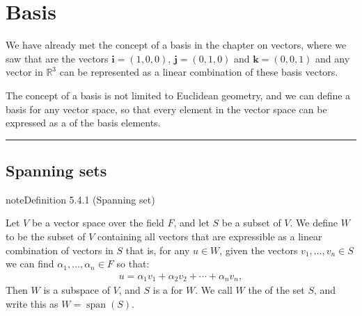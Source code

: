 \documentclass[letterpaper,10pt,english]{jupyterBook}
\begin{document}
\sphinxstepscope

\ignorespaces 

\section{Basis}
\label{\detokenize{_pages/5.4_Basis:basis}}\label{\detokenize{_pages/5.4_Basis:index-0}}\label{\detokenize{_pages/5.4_Basis:basis-section}}\label{\detokenize{_pages/5.4_Basis::doc}}
\sphinxAtStartPar
We have already met the concept of a basis in the chapter on vectors, where we saw that {\hyperref[\detokenize{_pages/3.4_Linear_combinations:basis-vectors-section}]{}} are the vectors \(\mathbf{i} = (1, 0, 0)\), \(\mathbf{j} = (0, 1, 0)\) and \(\mathbf{k} = (0, 0, 1)\) and any vector in \(\mathbb{R}^3\) can be represented as a linear combination of these basis vectors.

\sphinxAtStartPar
The concept of a basis is not limited to Euclidean geometry, and we can define a basis for any vector space, so that every element in the vector space can be expressed as a {\hyperref[\detokenize{_pages/3.4_Linear_combinations:linear-combination-of-vectors-definition}]{}} of the basis elements.


\bigskip\hrule\bigskip


\ignorespaces 

\subsection{Spanning sets}
\label{\detokenize{_pages/5.4_Basis:spanning-sets}}\label{\detokenize{_pages/5.4_Basis:index-1}}\label{_pages/5.4_Basis:spanning-set-definition}
\begin{sphinxadmonition}{note}{Definition 5.4.1 (Spanning set)}



\sphinxAtStartPar
Let \(V\) be a vector space over the field \(F\), and let \(S\) be a subset of \(V\). We define \(W\) to be the subset of \(V\) containing all vectors that are expressible as a linear combination of vectors in \(S\) \sphinxhyphen{} that is, for any \(u \in W\), given the vectors \(v_1, \ldots, v_n \in S\) we can find \(\alpha_1, \ldots, \alpha_n \in F\) so that:
\begin{equation*}
\begin{split} u = \alpha_1 v_1 + \alpha_2 v_2 + \cdots + \alpha_n v_n, \end{split}
\end{equation*}
\sphinxAtStartPar
Then \(W\) is a subspace of \(V\), and \(S\) is a  for \(W\). We call \(W\) the  of the set \(S\), and write this as \(W = \operatorname{span}(S)\).
\end{sphinxadmonition}
\end{document}
